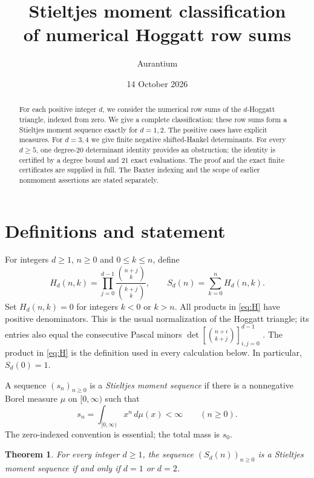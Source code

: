 \documentclass[11pt]{article}
\title{Stieltjes moment classification\protect\\ of numerical Hoggatt row sums}
\author{Aurantium}
\date{14 October 2026}
\newtheorem{theorem}{Theorem}
\begin{document}
\maketitle

\begin{abstract}
For each positive integer $d$, we consider the numerical row sums of the
$d$-Hoggatt triangle, indexed from zero. We give a complete classification:
these row sums form a Stieltjes moment sequence exactly for $d=1,2$.
The positive cases have explicit measures. For $d=3,4$ we give finite
negative shifted-Hankel determinants. For every $d\geq5$, one degree-20
determinant identity provides an obstruction; the identity is certified
by a degree bound and 21 exact evaluations. The proof and the exact
finite certificates are supplied in full. The Baxter indexing and the
scope of earlier nonmoment assertions are stated separately.
\end{abstract}

\section{Definitions and statement}

For integers $d\geq1$, $n\geq0$ and $0\leq k\leq n$, define
\begin{equation}\label{eq:H}
 H_d(n,k)=\prod_{j=0}^{d-1}
       \frac{\binom{n+j}{k}}{\binom{k+j}{k}},
 \qquad S_d(n)=\sum_{k=0}^{n}H_d(n,k).
\end{equation}
Set $H_d(n,k)=0$ for integers $k<0$ or $k>n$.
All products in \eqref{eq:H} have positive denominators.
This is the usual normalization of the Hoggatt triangle; its entries
also equal the consecutive Pascal minors
$\det[\binom{n+i}{k+j}]_{i,j=0}^{d-1}$
\cite[Definition 1.1 and (2.1)]{MS}. The product in \eqref{eq:H}
is the definition used in every calculation below. In particular,
$S_d(0)=1$.

A sequence $(s_n)_{n\geq0}$ is a \emph{Stieltjes moment sequence}
if there is a nonnegative Borel measure $\mu$ on $[0,\infty)$ such that
\begin{equation}\label{eq:moment}
 s_n=\int_{[0,\infty)}x^n\,d\mu(x)<\infty
 \qquad(n\geq0).
\end{equation}
The zero-indexed convention is essential; the total mass is $s_0$.

\begin{theorem}\label{thm:classification}
For every integer $d\geq1$, the sequence $(S_d(n))_{n\geq0}$ is
a Stieltjes moment sequence if and only if $d=1$ or $d=2$.
\end{theorem}
\end{document}
